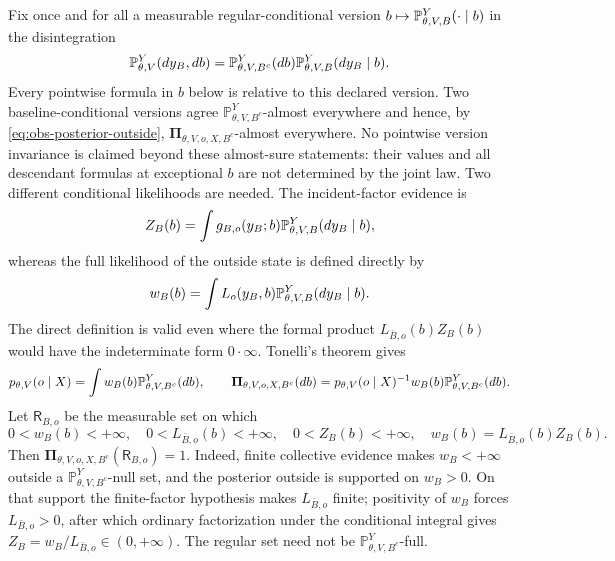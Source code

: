 Fix once and for all a measurable regular-conditional version
\(b\mapsto\mathbb P_{\theta,V,B}^{Y}(\cdot\mid b)\) in the disintegration
\begin{equation}
\mathbb P_{\theta,V}^{Y}(dy_B,db)
=\mathbb P_{\theta,V,B^c}^{Y}(db)
\mathbb P_{\theta,V,B}^{Y}(dy_B\mid b).
\label{eq:obs-baseline-block-disintegration}
\end{equation}
Every pointwise formula in $b$ below is relative to this declared version.
Two baseline-conditional versions agree
\(\mathbb P_{\theta,V,B^c}^{Y}\)-almost everywhere and
hence, by \eqref{eq:obs-posterior-outside},
\(\boldsymbol\Pi_{\theta,V,o,X,B^c}\)-almost everywhere.
No pointwise version invariance is claimed beyond these almost-sure statements:
their values and all descendant formulas at exceptional $b$ are not determined
by the joint law.  Two different conditional likelihoods are needed.
The incident-factor evidence is
\begin{equation}
Z_B(b)=\int g_{B,o}(y_B;b)
\mathbb P_{\theta,V,B}^{Y}(dy_B\mid b),
\label{eq:obs-local-evidence}
\end{equation}
whereas the full likelihood of the outside state is defined directly by
\begin{equation}
w_B(b)=\int L_o(y_B,b)
\mathbb P_{\theta,V,B}^{Y}(dy_B\mid b).
\label{eq:obs-full-complement-likelihood}
\end{equation}
The direct definition is valid even where the formal product
$L_{\bar B,o}(b)Z_B(b)$ would have the indeterminate form $0\cdot\infty$.
Tonelli's theorem gives
\begin{equation}
p_{\theta,V}(o\mid X)
=\int w_B(b)\mathbb P_{\theta,V,B^c}^{Y}(db),
\qquad
\boldsymbol\Pi_{\theta,V,o,X,B^c}(db)
=p_{\theta,V}(o\mid X)^{-1}
w_B(b)\mathbb P_{\theta,V,B^c}^{Y}(db).
\label{eq:obs-posterior-outside}
\end{equation}
Let $\mathsf R_{B,o}$ be the measurable set on which
\begin{equation}
0<w_B(b)<+\infty,
\quad 0<L_{\bar B,o}(b)<+\infty,
\quad 0<Z_B(b)<+\infty,
\quad w_B(b)=L_{\bar B,o}(b)Z_B(b).
\label{eq:obs-block-regular-set}
\end{equation}
Then \(\boldsymbol\Pi_{\theta,V,o,X,B^c}(\mathsf R_{B,o})=1\). Indeed, finite collective evidence
makes \(w_B<+\infty\) outside a \(\mathbb P_{\theta,V,B^c}^{Y}\)-null set, and the posterior outside
is supported on $w_B>0$.  On that support the finite-factor hypothesis makes
$L_{\bar B,o}$ finite; positivity of $w_B$ forces
$L_{\bar B,o}>0$, after which ordinary factorization under the conditional
integral gives $Z_B=w_B/L_{\bar B,o}\in(0,+\infty)$.  The regular set need not
be \(\mathbb P_{\theta,V,B^c}^{Y}\)-full. 

